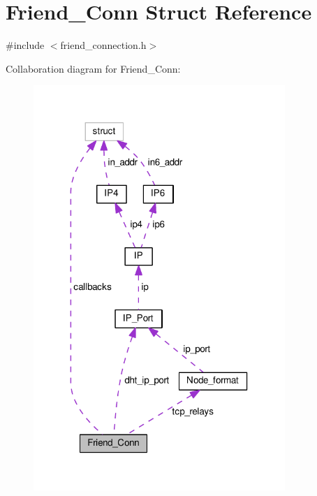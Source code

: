 \hypertarget{struct_friend___conn}{\section{Friend\+\_\+\+Conn Struct Reference}
\label{struct_friend___conn}
}


{\ttfamily \#include $<$friend\+\_\+connection.\+h$>$}



Collaboration diagram for Friend\+\_\+\+Conn\+:
\nopagebreak
\begin{figure}[H]
\begin{center}
\leavevmode
\includegraphics[width=270pt]{d9/d7e/struct_friend___conn__coll__graph}
\end{center}
\end{figure}
